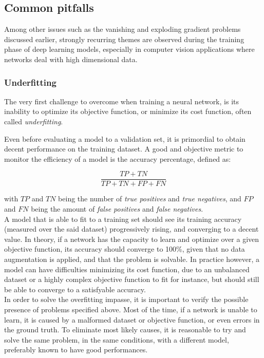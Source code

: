 \subsection{Common pitfalls}

Among other issues such as the vanishing and exploding gradient problems
discussed earlier, strongly recurring themes are observed during the training
phase of deep learning models, especially in computer vision applications where
networks deal with high dimensional data.

	\subsubsection{Underfitting}
The very first challenge to overcome when training a neural network, is its
inability to optimize its objective function, or minimize its cost function,
often called \emph{underfitting}.

Even before evaluating a model to a validation set, it is primordial to obtain
decent performance on the training dataset. A good and objective metric to
monitor the efficiency of a model is the accuracy percentage, defined as:

\begin{equation}
	\frac{TP+TN}{TP+TN+FP+FN}
\end{equation}

with $TP$ and $TN$ being the number of \emph{true positives} and \emph{true
negatives}, and $FP$ and $FN$ being the amount of \emph{false positives} and
\emph{false negatives}.\\

A model that is able to fit to a training set should see its training accuracy
(measured over the said dataset) progressively rising, and converging to a
decent value. In theory, if a network has the capacity to learn and optimize
over a given objective function, its accuracy should converge to 100\%, given
that no data augmentation is applied, and that the problem is solvable. In
practice however, a model can have difficulties minimizing its cost function,
due to an unbalanced dataset or a highly complex objective function to fit for
instance, but should still be able to converge to a satisfyable accuracy.\\

In order to solve the overfitting impasse, it is important to verify the
possible presence of problems specified above. Most of the time, if a network
is unable to learn, it is caused by a malformed dataset or objective function,
or even errors in the ground truth. To eliminate most likely causes, it is
reasonable to try and solve the same problem, in the same conditions, with a
different model, preferably known to have good performances.\\

